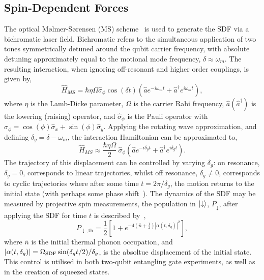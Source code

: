 \subsection{Spin-Dependent Forces}
\label{sec:Spin-Dependent Forces}
    The optical Mølmer-Sørensen (MS) scheme~\cite{sorensen2000entanglement} is used to generate the
    SDF via a bichromatic laser field. Bichromatic refers to the simultaneous
    application of two tones symmetrically detuned around the qubit carrier
    frequency, with absolute detuning approximately equal to the motional mode
    frequency, $\delta \approx \omega_{m}$. The resulting interaction, when
    ignoring off-resonant and higher order couplings, is given by,
    \begin{equation}
        \hat{H}_{MS} = \hbar \eta\Omega\hat{\sigma}_\phi\cos(\delta t) \left( \hat{a} e^{-i\omega_{m} t} + \hat{a}^\dagger e^{i\omega_{m} t} \right),
    \end{equation}
    where $\eta$ is the Lamb-Dicke parameter, $\Omega$ is the carrier Rabi
    frequency, $\hat{a}(\hat{a}^\dagger)$ is the lowering (raising) operator, and
    $\hat{\sigma}_\phi$ is the Pauli operator with $\hat{\sigma}_\phi = \cos(\phi)\hat{\sigma}_x + \sin(\phi)\hat{\sigma}_y$.
    Applying the rotating wave approximation, and defining $\delta_g = \delta -
    \omega_{m}$, the interaction Hamiltonian can be approximated
    to,
    \begin{equation}
        \label{eqn:MS}
        \hat{H}_{MS} \approx \frac{\hbar \eta\Omega}{2}~\hat{\sigma}_\phi \left( \hat{a} e^{-i\delta_g t} + \hat{a}^\dagger e^{i\delta_g t} \right).
    \end{equation}
    The trajectory of this displacement can be controlled by varying $\delta_g$: on
    resonance, $\delta_g = 0$, corresponds to linear trajectories, whilst off resonance,
    $\delta_g \neq 0$, corresponds to cyclic trajectories where after some time $t =
    2\pi/\delta_g$, the motion returns to the initial state (with perhaps some phase shift~\cite{haljan2005spin-dependent}). 
    The dynamics of the SDF may be measured by projective spin measurements, the population in $\ket{\downarrow}$, $P_\downarrow$, after applying the SDF for time $t$ is described by~\cite{burd2020squeezing},
    \begin{equation}
        \label{eqn:sdf_pop}
        P_{\downarrow,\mathrm{th}} = \frac{1}{2} \left[ 1 + e^{-4\left( \bar{n} + \frac{1}{2} \right) |\alpha(t, \delta_g)|^2} \right],
    \end{equation}
    where $\bar{n}$ is the initial thermal phonon occupation, and $|\alpha(t, \delta_g)| = \Omega_{\rm SDF} \sin(\delta_g t/2)/\delta_g$, is the absoltue displacement of the initial state.
    This control is utilised in both two-qubit entangling gate experiments, as well as
    in the creation of squeezed states.\\

